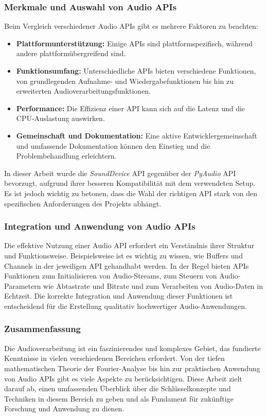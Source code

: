 \documentclass[11pt,a4paper]{article}
\begin{document}
\subsubsection{Merkmale und Auswahl von Audio APIs}
Beim Vergleich verschiedener Audio APIs gibt es mehrere Faktoren zu beachten:
\begin{itemize}
\item \textbf{Plattformunterstützung:} Einige APIs sind plattformspezifisch, während andere 
plattformübergreifend sind.
\item \textbf{Funktionsumfang:} Unterschiedliche APIs bieten verschiedene Funktionen, von 
grundlegenden Aufnahme- und Wiedergabefunktionen bis hin zu erweiterten 
Audioverarbeitungsfunktionen.
\item \textbf{Performance:} Die Effizienz einer API kann sich auf die Latenz und die CPU-Auslastung 
auswirken.
\item \textbf{Gemeinschaft und Dokumentation:} Eine aktive Entwicklergemeinschaft und umfassende 
Dokumentation können den Einstieg und die Problembehandlung erleichtern.
\end{itemize}

\noindent
In dieser Arbeit wurde die \textit{SoundDevice} API gegenüber der \textit{PyAudio} API bevorzugt, 
aufgrund ihrer besseren Kompatibilität mit dem verwendeten Setup. Es ist jedoch wichtig zu betonen, 
dass die Wahl der richtigen API stark von den spezifischen Anforderungen des Projekts abhängt.

\subsubsection{Integration und Anwendung von Audio APIs}
Die effektive Nutzung einer Audio API erfordert ein Verständnis ihrer Struktur und Funktionsweise. 
Beispielsweise ist es wichtig zu wissen, wie Buffers und Channels in der jeweiligen API gehandhabt 
werden. In der Regel bieten APIs Funktionen zum Initialisieren von Audio-Streams, zum Steuern von 
Audio-Parametern wie Abtastrate und Bitrate und zum Verarbeiten von Audio-Daten in Echtzeit. Die 
korrekte Integration und Anwendung dieser Funktionen ist entscheidend für die Erstellung qualitativ 
hochwertiger Audio-Anwendungen.

\subsubsection{Zusammenfassung}
Die Audioverarbeitung ist ein faszinierendes und komplexes Gebiet, das fundierte Kenntnisse in 
vielen verschiedenen Bereichen erfordert. Von der tiefen mathematischen Theorie der Fourier-Analyse 
bis hin zur praktischen Anwendung von Audio APIs gibt es viele Aspekte zu berücksichtigen. Diese 
Arbeit zielt darauf ab, einen umfassenden Überblick über die Schlüsselkonzepte und Techniken in 
diesem Bereich zu geben und als Fundament für zukünftige Forschung und Anwendung zu dienen.
\end{document}

